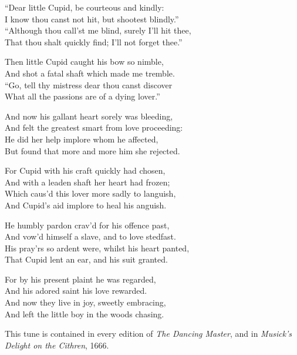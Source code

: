 \pagebreak

\settowidth{\versewidth}{“Although thou call’st me blind, surely I’ll hit thee,}
\begin{dcverse}\footnotesizerr
“Dear little Cupid, be courteous and kindly:\\
I know thou canst not hit, but shootest blindly.” \\
“Although thou call’st me blind, surely I’ll hit thee,\\
That thou shalt quickly find; I’ll not forget thee.”

Then little Cupid caught his bow so nimble,\\
And shot a fatal shaft which made me tremble.\\
“Go, tell thy mistress dear thou canst discover\\
What all the passions are of a dying lover.”

And now his gallant heart sorely was bleeding,\\
And felt the greatest smart from love proceeding:\\
He did her help implore whom he affected,\\
But found that more and more him she rejected.

For Cupid with his craft quickly had chosen,\\
And with a leaden shaft her heart had frozen;\\
Which caus’d this lover more sadly to languish,\\
And Cupid’s aid implore to heal his anguish.

He humbly pardon crav’d for his offence past,\\
And vow’d himself a slave, and to love stedfast.\\
His pray’rs so ardent were, whilst his heart panted,\\
That Cupid lent an ear, and his suit granted.

For by his present plaint he was regarded,\\
And his adored saint his love rewarded.\\
And now they live in joy, sweetly embracing,\\
And left the little boy in the woods chasing.
\end{dcverse}


This tune is contained in every edition of \textit{The Dancing Master}, and in \textit{Musick’s
Delight on the Cithren}, 1666.

